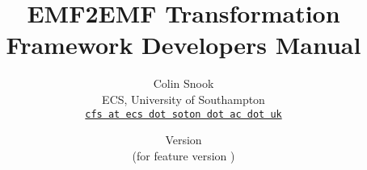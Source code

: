 \documentclass[a4paper,10pt]{article}
\title{EMF2EMF Transformation Framework Developers Manual}
\author{%
  Colin Snook\\%
  ECS, University of Southampton\\%
  \texttt{\href{mailto:cfs@ecs.soton.ac.uk}{cfs at ecs dot soton dot ac dot uk}}%
}%
\date{%
  Version \EMFEMFManualVersion\\%
  (for feature version \EMFEMFFeatureVersion)\\
  \ifplastex
  \EMFEMFManualDate
  \else
  \displaydate{EMFEMFManualDate}%
  \fi
}
\begin{document}
\ifplastex%
\maketitle%
\else%
 \ifstandalone%
 \maketitle %
 \else%
 \fi%
\fi%











%


\end{document}
